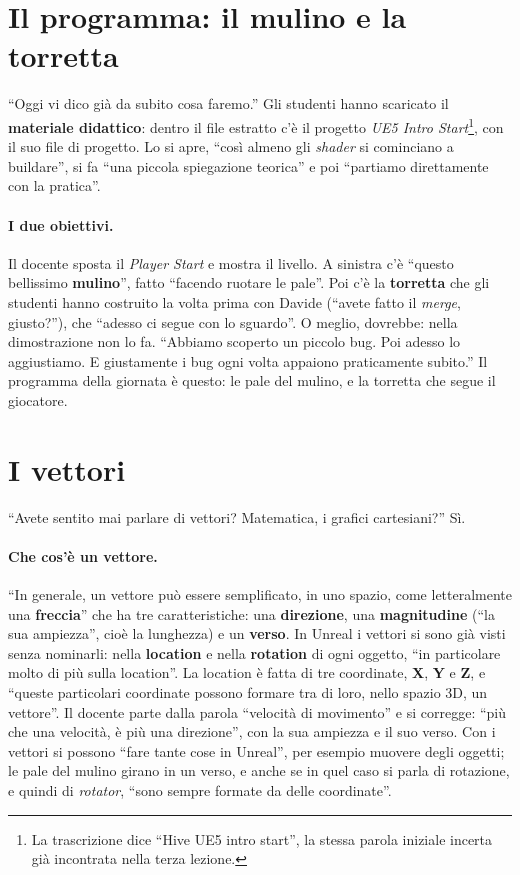\section{Il programma: il mulino e la torretta}
\label{ue4:sec:programma}

``Oggi vi dico già da subito cosa faremo.'' Gli studenti hanno scaricato il
\textbf{materiale didattico}: dentro il file estratto c'è il progetto
\emph{UE5 Intro Start}\footnote{La trascrizione dice ``Hive UE5 intro start'', la stessa
parola iniziale incerta già incontrata nella terza lezione.}, con il suo file di
progetto. Lo si apre, ``così almeno gli \emph{shader} si cominciano a buildare'', si fa
``una piccola spiegazione teorica'' e poi ``partiamo direttamente con la pratica''.

\paragraph{I due obiettivi.} Il docente sposta il \emph{Player Start} e mostra il
livello. A sinistra c'è ``questo bellissimo \textbf{mulino}'', fatto ``facendo ruotare
le pale''. Poi c'è la \textbf{torretta} che gli studenti hanno costruito la volta prima
con Davide (``avete fatto il \emph{merge}, giusto?''), che ``adesso ci segue con lo
sguardo''. O meglio, dovrebbe: nella dimostrazione non lo fa. ``Abbiamo scoperto un
piccolo bug. Poi adesso lo aggiustiamo. E giustamente i bug ogni volta appaiono
praticamente subito.'' Il programma della giornata è questo: le pale del mulino, e la
torretta che segue il giocatore.

\section{I vettori}
\label{ue4:sec:vettori}

``Avete sentito mai parlare di vettori? Matematica, i grafici cartesiani?'' Sì.

\paragraph{Che cos'è un vettore.} ``In generale, un vettore può essere semplificato, in
uno spazio, come letteralmente una \textbf{freccia}'' che ha tre caratteristiche: una
\textbf{direzione}, una \textbf{magnitudine} (``la sua ampiezza'', cioè la lunghezza) e
un \textbf{verso}. In Unreal i vettori si sono già visti senza nominarli: nella
\textbf{location} e nella \textbf{rotation} di ogni oggetto, ``in particolare molto di
più sulla location''. La location è fatta di tre coordinate, \textbf{X}, \textbf{Y} e
\textbf{Z}, e ``queste particolari coordinate possono formare tra di loro, nello spazio
3D, un vettore''. Il docente parte dalla parola ``velocità di movimento'' e si corregge:
``più che una velocità, è più una direzione'', con la sua ampiezza e il suo verso.
Con i vettori si possono ``fare tante cose in Unreal'', per esempio muovere degli
oggetti; le pale del mulino girano in un verso, e anche se in quel caso si parla di
rotazione, e quindi di \emph{rotator}, ``sono sempre formate da delle coordinate''.

